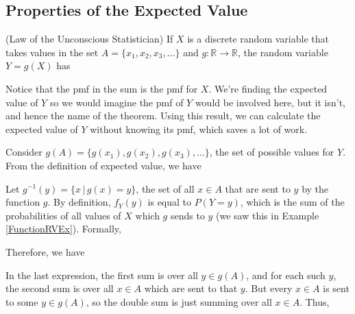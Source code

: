 \subsection*{Properties of the Expected Value}

\begin{thm}\label{LawUnconsciousStatistician}
(Law of the Unconscious Statistician) If $X$ is a discrete random variable that takes values in the set $A = \{x_1, x_2, x_3, \dots\}$ and $g: \mathbb{R} \to \mathbb{R}$, the random variable $Y = g(X)$ has
\end{thm}
\par
Notice that the pmf in the sum is the pmf for $X$. We're finding the expected value of $Y$ so we would imagine the pmf of $Y$ would be involved here, but it isn't, and hence the name of the theorem. Using this result, we can calculate the expected value of $Y$ without knowing its pmf, which saves a lot of work.
\par
\vspace{0.5em}
\begin{pf}
Consider $g(A) = \{g(x_1), g(x_2), g(x_3), \dots\}$, the set of possible values for $Y$. From the definition of expected value, we have
\par
\noindent Let $g^{-1}(y) = \{x \, | \, g(x) = y\}$, the set of all $x \in A$ that are sent to $y$ by the function $g$. By definition, $f_Y(y)$ is equal to $P(Y=y)$, which is the sum of the probabilities of all values of $X$ which $g$ sends to $y$ (we saw this in Example \ref{FunctionRVEx}). Formally, 
\par
\noindent Therefore, we have
\par
\noindent In the last expression, the first sum is over all $y \in g(A)$, and for each such $y$, the second sum is over all $x \in A$ which are sent to that $y$. But every $x \in A$ is sent to some $y \in g(A)$, so the double sum is just summing over all $x \in A$. Thus,
\end{pf}

